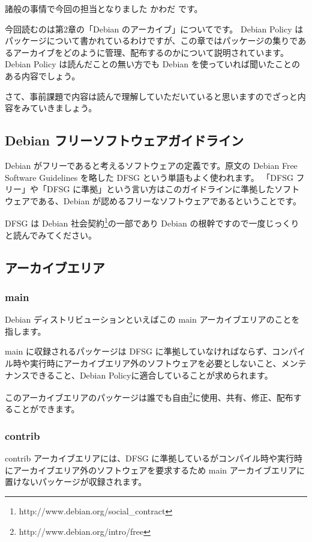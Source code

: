 \documentclass[mingoth,a4paper]{jsarticle}
\begin{document}

諸般の事情で今回の担当となりました かわだ です。

今回読むのは第2章の「Debian のアーカイブ」についてです。
Debian Policy はパッケージについて書かれているわけですが、この章ではパッケージの集りであるアーカイブをどのように管理、配布するのかについて説明されています。
Debian Policy は読んだことの無い方でも Debian を使っていれば聞いたことのある内容でしょう。

さて、事前課題で内容は読んで理解していただいていると思いますのでざっと内容をみていきましょう。

\subsection{Debian フリーソフトウェアガイドライン}
Debian がフリーであると考えるソフトウェアの定義です。原文の Debian Free Software Guidelines を略した DFSG という単語もよく使われます。
「DFSG フリー」や「DFSG に準拠」という言い方はこのガイドラインに準拠したソフトウェアである、Debian が認めるフリーなソフトウェアであるということです。

DFSG は Debian 社会契約\footnote{http://www.debian.org/social\_contract}の一部であり Debian の根幹ですので一度じっくりと読んでみてください。

\subsection{アーカイブエリア}
\subsubsection{main}
Debian ディストリビューションといえばこの main アーカイブエリアのことを指します。

main に収録されるパッケージは DFSG に準拠していなければならず、コンパイル時や実行時にアーカイブエリア外のソフトウェアを必要としないこと、メンテナンスできること、Debian Policyに適合していることが求められます。

このアーカイブエリアのパッケージは誰でも自由\footnote{http://www.debian.org/intro/free}に使用、共有、修正、配布することができます。

\subsubsection{contrib}
contrib アーカイブエリアには、DFSG に準拠しているがコンパイル時や実行時にアーカイブエリア外のソフトウェアを要求するため main アーカイブエリアに置けないパッケージが収録されます。
\end{document}
